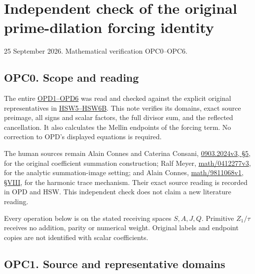 \section{Independent check of the original prime-dilation forcing
identity}\label{independent-check-of-the-original-prime-dilation-forcing-identity}

25 September 2026. Mathematical verification OPC0--OPC6.

\subsection{OPC0. Scope and reading}\label{opc0.-scope-and-reading}

The entire
\href{https://github.com/KokunoYumeto/zeta-function-research-reader/blob/main/workbenches/splitzero-tandem/continuations/20260925-full-source-tensor-and-original-divisor/counterfactual/ORIGINAL_PRIME_DILATION_FORCING_IDENTITY.md}{OPD1--OPD6}
was read and checked against the explicit original representatives in
\href{https://github.com/KokunoYumeto/zeta-function-research-reader/blob/main/workbenches/splitzero-tandem/continuations/20260925-full-source-tensor-and-original-divisor/counterfactual/ORIGINAL_ZETA_HARMONIC_SWEEP_AND_OFFCRITICAL_DEFECT.md}{HSW5--HSW6B}.
This note verifies its domains, exact source preimage, all signs and
scalar factors, the full divisor sum, and the reflected cancellation. It
also calculates the Mellin endpoints of the forcing term. No correction
to OPD's displayed equations is required.

The human sources remain Alain Connes and Caterina Consani,
\href{https://arxiv.org/abs/0903.2024v3}{0903.2024v3, §5}, for the
original coefficient summation construction; Ralf Meyer,
\href{https://arxiv.org/abs/math/0412277v3}{math/0412277v3}, for the
analytic summation-image setting; and Alain Connes,
\href{https://arxiv.org/abs/math/9811068v1}{math/9811068v1, §VIII}, for
the harmonic trace mechanism. Their exact source reading is recorded in
OPD and HSW. This independent check does not claim a new literature
reading.

Every operation below is on the stated receiving spaces \(S,A,J,Q\).
Primitive \(Z_1/\tau\) receives no addition, parity or numerical weight.
Original labels and endpoint copies are not identified with scalar
coefficients.

\subsection{OPC1. Source and representative
domains}\label{opc1.-source-and-representative-domains}

